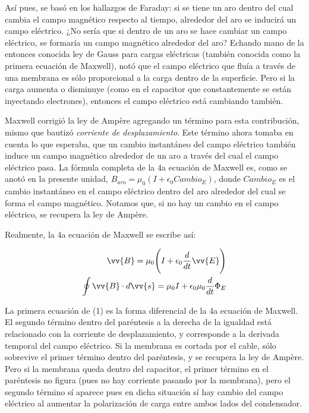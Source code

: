 \documentclass{article}
\begin{document}
Así pues, se basó en los hallazgos de Faraday: si se tiene un aro dentro del cual cambia el campo magnético respecto al tiempo, alrededor del aro se inducirá un campo eléctrico. ¿No sería que si dentro de un aro se hace cambiar un campo eléctrico, se formaría un campo magnético alrededor del aro? Echando mano de la entonces conocida ley de Gauss para cargas eléctricas (también conocida como la primera ecuación de Maxwell), notó que el campo eléctrico que fluía a través de una membrana es sólo proporcional a la carga dentro de la superficie. Pero si la carga aumenta o disminuye (como en el capacitor que constantemente se están inyectando electrones), entonces el campo eléctrico está cambiando también.\bigskip

Maxwell corrigió la ley de Ampère agregando un término para esta contribución, mismo que bautizó \emph{corriente de desplazamiento}. Este término ahora tomaba en cuenta lo que esperaba, que un cambio instantáneo del campo eléctrico también induce un campo magnético alrededor de un aro a través del cual el campo eléctrico pasa. La fórmula completa de la 4a ecuación de Maxwell es, como se anotó en la presente unidad, $B_{aro}=\mu_0(I+\epsilon_0Cambio_E)$, donde $Cambio_E$ es el cambio instantáneo en el campo eléctrico dentro del aro alrededor del cual se forma el campo magnético. Notamos que, si no hay un cambio en el campo eléctrico, se recupera la ley de Ampère.\bigskip

Realmente, la 4a ecuación de Maxwell se escribe así:\bigskip

\begin{equation}
\begin{aligned}
\vv{B}=\mu_0\Bigg(I+\epsilon_0\frac{d}{dt}\vv{E}\Bigg)\\
\oint\vv{B}\cdot{d}\vv{s}=\mu_0I+\epsilon_0\mu_0\frac{d}{dt}\Phi_E
\end{aligned}
\end{equation}\bigskip

La primera ecuación de (1) es la forma diferencial de la 4a ecuación de Maxwell. El segundo término dentro del paréntesis a la derecha de la igualdad está relacionado con la corriente de desplazamiento, y corresponde a la derivada temporal del campo eléctrico. Si la membrana es cortada por el cable, sólo sobrevive el primer término dentro del paréntesis, y se recupera la ley de Ampère. Pero si la membrana queda dentro del capacitor, el primer término en el paréntesis no figura (pues no hay corriente pasando por la membrana), pero el segundo término sí aparece pues en dicha situación sí hay cambio del campo eléctrico al aumentar la polarización de carga entre ambos lados del condensador.\bigskip
\end{document}
